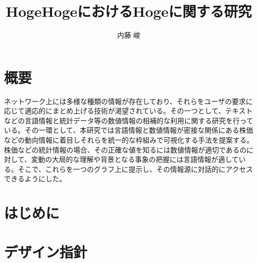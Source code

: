 \documentclass{matsushita-zemi}
\title{HogeHogeにおけるHogeに関する研究}
\author{内藤 峻}
\begin{document}
\maketitle

\section*{概要}
\label{abstract}
ネットワーク上には多様な種類の情報が存在しており、それらをユーザの要求に応じて適応的にまとめ上げる技術が渇望されている。その一つとして、テキストなどの言語情報と統計データ等の数値情報の相補的な利用に関する研究を行っている。その一環として、本研究では言語情報と数値情報が密接な関係にある株価などの動向情報に着目しそれらを統一的な枠組みで可視化する手法を提案する。株価などの統計情報の場合、その正確な値を知るには数値情報が適切であるのに対して、変動の大局的な理解や背景となる事象の把握には言語情報が適している。そこで、これらを一つのグラフ上に提示し、その情報源に対話的にアクセスできるようにした。

\section{はじめに}
\label{background} 

\section{デザイン指針}
\end{document}
